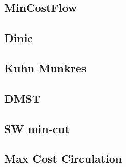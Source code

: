 \documentclass[a4paper,10pt,twocolumn,oneside]{article}
\begin{document}
%

\subsection{MinCostFlow}


\subsection{Dinic}


%

%

%

\subsection{Kuhn Munkres}


\subsection{DMST}


\subsection{SW min-cut}


\subsection{Max Cost Circulation}

\end{document}
